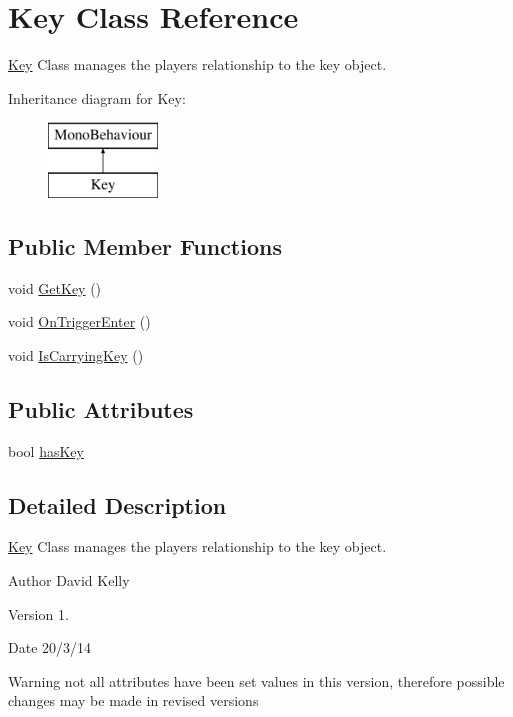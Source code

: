 \hypertarget{class_key}{\section{Key Class Reference}
\label{class_key}
}


\hyperlink{class_key}{Key} Class manages the players relationship to the key object.  


Inheritance diagram for Key\-:\begin{figure}[H]
\begin{center}
\leavevmode
\includegraphics[height=2.000000cm]{class_key}
\end{center}
\end{figure}
\subsection*{Public Member Functions}
\begin{DoxyCompactItemize}
\item 
void \hyperlink{class_key_aecaf17de893ef397f360a368892448e7}{Get\-Key} ()
\item 
void \hyperlink{class_key_a2d8b49568aded373da3ff833e626f1cf}{On\-Trigger\-Enter} ()
\item 
void \hyperlink{class_key_a786da39be277934bf4fb4e9ddc4fd768}{Is\-Carrying\-Key} ()
\end{DoxyCompactItemize}
\subsection*{Public Attributes}
\begin{DoxyCompactItemize}
\item 
bool \hyperlink{class_key_a10a2d4aeb1d0e65e6610b2b066fc5752}{has\-Key}
\end{DoxyCompactItemize}


\subsection{Detailed Description}
\hyperlink{class_key}{Key} Class manages the players relationship to the key object. 

\begin{DoxyAuthor}{Author}
David Kelly 
\end{DoxyAuthor}
\begin{DoxyVersion}{Version}
1. 
\end{DoxyVersion}
\begin{DoxyDate}{Date}
20/3/14
\end{DoxyDate}
\begin{DoxyWarning}{Warning}
not all attributes have been set values in this version, therefore possible changes may be made in revised versions 
\end{DoxyWarning}


